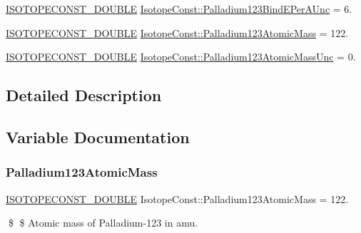 \begin{DoxyCompactItemize}
\mbox{\hyperlink{group___isotope_const-_macros_ga8f45a7272ce02c0b4c65c44636ed719a}{I\+S\+O\+T\+O\+P\+E\+C\+O\+N\+S\+T\+\_\+\+D\+O\+U\+B\+LE}} \mbox{\hyperlink{group___isotope_const-_palladium-_pd123_gaa4f3e2140f53762fc07306a72bf360d1}{Isotope\+Const\+::\+Palladium123\+Bind\+E\+Per\+A\+Unc}} = 6.
\item 
\mbox{\hyperlink{group___isotope_const-_macros_ga8f45a7272ce02c0b4c65c44636ed719a}{I\+S\+O\+T\+O\+P\+E\+C\+O\+N\+S\+T\+\_\+\+D\+O\+U\+B\+LE}} \mbox{\hyperlink{group___isotope_const-_palladium-_pd123_ga23c6adba356649fad8133971ebc6620a}{Isotope\+Const\+::\+Palladium123\+Atomic\+Mass}} = 122.
\item 
\mbox{\hyperlink{group___isotope_const-_macros_ga8f45a7272ce02c0b4c65c44636ed719a}{I\+S\+O\+T\+O\+P\+E\+C\+O\+N\+S\+T\+\_\+\+D\+O\+U\+B\+LE}} \mbox{\hyperlink{group___isotope_const-_palladium-_pd123_ga1adfee95700661374a52ecfe64b541ac}{Isotope\+Const\+::\+Palladium123\+Atomic\+Mass\+Unc}} = 0.
\end{DoxyCompactItemize}


\subsection{Detailed Description}


\subsection{Variable Documentation}
\mbox{\label{group___isotope_const-_palladium-_pd123_ga23c6adba356649fad8133971ebc6620a}} 
\subsubsection{\texorpdfstring{Palladium123\+Atomic\+Mass}{Palladium123AtomicMass}}
{\footnotesize\ttfamily \mbox{\hyperlink{group___isotope_const-_macros_ga8f45a7272ce02c0b4c65c44636ed719a}{I\+S\+O\+T\+O\+P\+E\+C\+O\+N\+S\+T\+\_\+\+D\+O\+U\+B\+LE}} Isotope\+Const\+::\+Palladium123\+Atomic\+Mass = 122.}

\$ \$ Atomic mass of Palladium-\/123 in amu. \mbox{\label{group___isotope_const-_palladium-_pd123_ga1adfee95700661374a52ecfe64b541ac}} 
